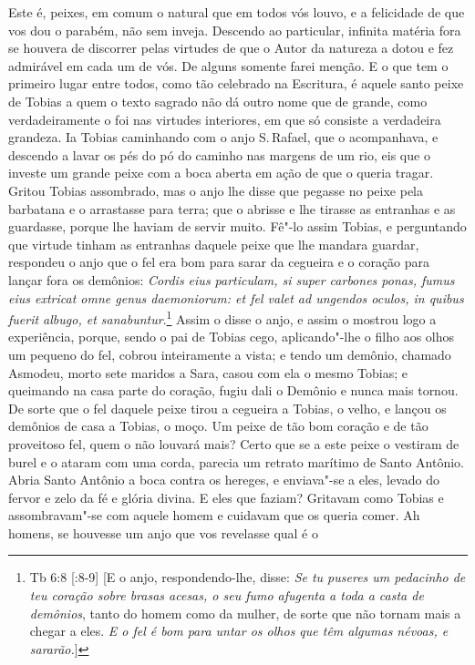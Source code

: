Este é, peixes, em comum o natural que em todos vós louvo, e a
felicidade de que vos dou o parabém, não sem inveja. Descendo ao
particular, infinita matéria fora se houvera de discorrer pelas virtudes
de que o Autor da natureza a dotou e fez admirável em cada um de vós. De
alguns somente farei menção. E o que tem o primeiro lugar entre todos,
como tão celebrado na Escritura, é aquele santo peixe de Tobias a quem o
texto sagrado não dá outro nome que de grande, como verdadeiramente o
foi nas virtudes interiores, em que só consiste a verdadeira grandeza.
Ia Tobias caminhando com o anjo S.\,Rafael, que o acompanhava, e descendo
a lavar os pés do pó do caminho nas margens de um rio, eis que o investe
um grande peixe com a boca aberta em ação de que o queria tragar. Gritou
Tobias assombrado, mas o anjo lhe disse que pegasse no peixe pela
barbatana e o arrastasse para terra; que o abrisse e lhe tirasse as
entranhas e as guardasse, porque lhe haviam de servir muito. Fê"-lo assim
Tobias, e perguntando que virtude tinham as entranhas daquele peixe que
lhe mandara guardar, respondeu o anjo que o fel era bom para sarar da
cegueira e o coração para lançar fora os demônios: \emph{Cordis eius
particulam, si super carbones ponas, fumus eius extricat omne genus
daemoniorum: et fel valet ad ungendos oculos, in quibus fuerit albugo,
et sanabuntur}.\footnote{Tb 6:8 [:8-9] [E o anjo, respondendo-lhe, disse: \emph{Se tu puseres um pedacinho de teu coração sobre brasas acesas, o seu fumo afugenta a toda a casta de demônios}, tanto do homem como da mulher, de sorte que não tornam mais a chegar a eles. \emph{E o fel é bom para untar os olhos que têm algumas
névoas, e sararão.}]} Assim o disse o anjo, e assim o mostrou logo a
experiência, porque, sendo o pai de Tobias cego, aplicando"-lhe o filho
aos olhos um pequeno do fel, cobrou inteiramente a vista; e tendo um
demônio, chamado Asmodeu, morto sete maridos a Sara, casou com ela o
mesmo Tobias; e queimando na casa parte do coração, fugiu dali o Demônio
e nunca mais tornou. De sorte que o fel daquele peixe tirou a cegueira a
Tobias, o velho, e lançou os demônios de casa a Tobias, o moço. Um peixe
de tão bom coração e de tão proveitoso fel, quem o não louvará mais?
Certo que se a este peixe o vestiram de burel e o ataram com uma corda,
parecia um retrato marítimo de Santo Antônio.
Abria Santo Antônio a boca contra os hereges, e enviava"-se a eles,
levado do fervor e zelo da fé e glória divina. E eles que faziam?
Gritavam como Tobias e assombravam"-se com aquele homem e cuidavam que os
queria comer. Ah homens, se houvesse um anjo que vos revelasse qual é o
